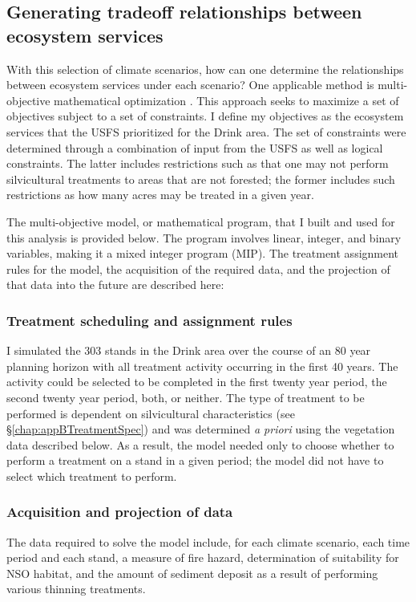 \subsection{Generating tradeoff relationships between ecosystem services}
\label{subsec:whyUsingMultiObjModel}
With this selection of climate scenarios, how can one determine the relationships between ecosystem services under each scenario? One applicable method is multi-objective mathematical optimization \cite{TothFsci2009}. This approach seeks to maximize a set of objectives subject to a set of constraints. I define my objectives as the ecosystem services that the USFS prioritized for the Drink area. The set of constraints were determined through a combination of input from the USFS as well as logical constraints. The latter includes restrictions such as that one may not perform silvicultural treatments to areas that are not forested; the former includes such restrictions as how many acres may be treated in a given year.

The multi-objective model, or mathematical program, that I built and used for this analysis is provided below. The program involves linear, integer, and binary variables, making it a mixed integer program (MIP). The treatment assignment rules for the model, the acquisition of the required data, and the projection of that data into the future are described here:

\subsubsection{Treatment scheduling and assignment rules}
I simulated the 303 stands in the Drink area over the course of an 80 year planning horizon with all treatment activity occurring in the first 40 years. The activity could be selected to be completed in the first twenty year period, the second twenty year period, both, or neither. The type of treatment to be performed is dependent on silvicultural characteristics (see \S \ref{chap:appBTreatmentSpec}) and was determined \textit{a priori} using the vegetation data described below. As a result, the model needed only to choose whether to perform a treatment on a stand in a given period; the model did not have to select which treatment to perform.

\subsubsection{Acquisition and projection of data}
The data required to solve the model include, for each climate scenario, each time period and each stand, a measure of fire hazard, determination of suitability for NSO habitat, and the amount of sediment deposit as a result of performing various thinning treatments.

